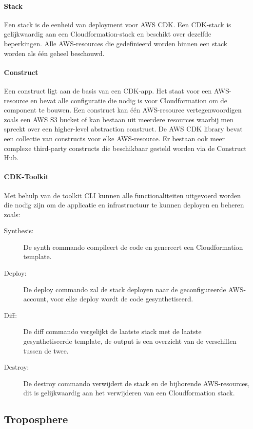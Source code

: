 \paragraph{Stack}

Een stack is de eenheid van deployment voor AWS CDK.
Een CDK-stack is gelijkwaardig aan een Cloudformation-stack en beschikt over dezelfde beperkingen.
Alle AWS-resources die gedefinieerd worden binnen een stack worden als één geheel beschouwd.

\paragraph{Construct}

Een construct ligt aan de basis van een CDK-app.
Het staat voor een AWS-resource en bevat alle configuratie die nodig is voor Cloudformation om de component te bouwen.
Een construct kan één AWS-resource vertegenwoordigen zoals een AWS S3 bucket of kan bestaan uit meerdere resources waarbij men spreekt over een higher-level abstraction construct.
De AWS CDK library bevat een collectie van constructs voor elke AWS-resource.
Er bestaan ook meer complexe third-party constructs die beschikbaar gesteld worden via de Construct Hub.

\paragraph{CDK-Toolkit}

Met behulp van de toolkit CLI kunnen alle functionaliteiten uitgevoerd worden die nodig zijn om de applicatie en infrastructuur te kunnen deployen en beheren zoals:

\begin{description}
    \item[Synthesis:] De synth commando compileert de code en genereert een Cloudformation template.
    \item[Deploy:] De deploy commando zal de stack deployen naar de geconfigureerde AWS-account, voor elke deploy wordt de code gesynthetiseerd.
    \item[Diff:] De diff commando vergelijkt de laatste stack met de laatste gesynthetiseerde template, de output is een overzicht van de verschillen tussen de twee.
    \item[Destroy:] De destroy commando verwijdert de stack en de bijhorende AWS-resources, dit is gelijkwaardig aan het verwijderen van een Cloudformation stack.
\end{description}

\subsection{Troposphere}
\label{sec:service-troposphere}